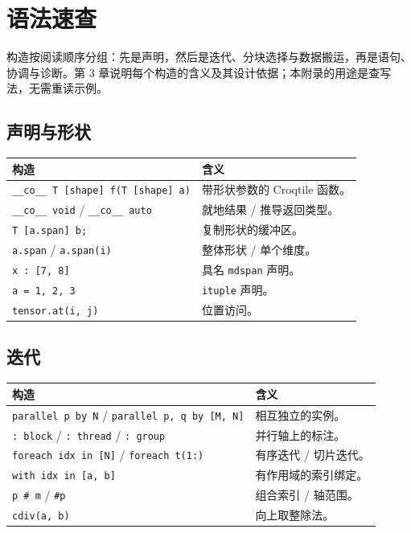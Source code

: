 \chapter{语法速查}
\label{app:quickref}

构造按阅读顺序分组：先是声明，然后是迭代、分块选择与数据搬运，再是语句、协调与诊断。第 3 章说明每个构造的含义及其设计依据；本附录的用途是查写法，无需重读示例。

\section{声明与形状}
\begin{table}[htbp]\centering\small
\begin{tabularx}{\linewidth}{@{}lX@{}}
\toprule
构造 & 含义 \\
\midrule
\texttt{\_\_co\_\_ T [shape] f(T [shape] a)} & 带形状参数的 Croqtile 函数。 \\
\texttt{\_\_co\_\_ void} / \texttt{\_\_co\_\_ auto} & 就地结果 / 推导返回类型。 \\
\texttt{T [a.span] b;} & 复制形状的缓冲区。 \\
\texttt{a.span} / \texttt{a.span(i)} & 整体形状 / 单个维度。 \\
\texttt{x : [7, 8]} & 具名 \texttt{mdspan} 声明。 \\
\texttt{a = {1, 2, 3}} & \texttt{ituple} 声明。 \\
\texttt{tensor.at(i, j)} & 位置访问。 \\
\bottomrule
\end{tabularx}
\end{table}

\section{迭代}
\begin{table}[htbp]\centering\small
\begin{tabularx}{\linewidth}{@{}lX@{}}
\toprule
构造 & 含义 \\
\midrule
\texttt{parallel p by N} / \texttt{parallel p, q by [M, N]} & 相互独立的实例。 \\
\texttt{: block} / \texttt{: thread} / \texttt{: group} & 并行轴上的标注。 \\
\texttt{foreach idx in [N]} / \texttt{foreach t(1:)} & 有序迭代 / 切片迭代。 \\
\texttt{with idx in [a, b]} & 有作用域的索引绑定。 \\
\texttt{p \# m} / \texttt{\#p} & 组合索引 / 轴范围。 \\
\texttt{cdiv(a, b)} & 向上取整除法。 \\
\bottomrule
\end{tabularx}
\end{table}

